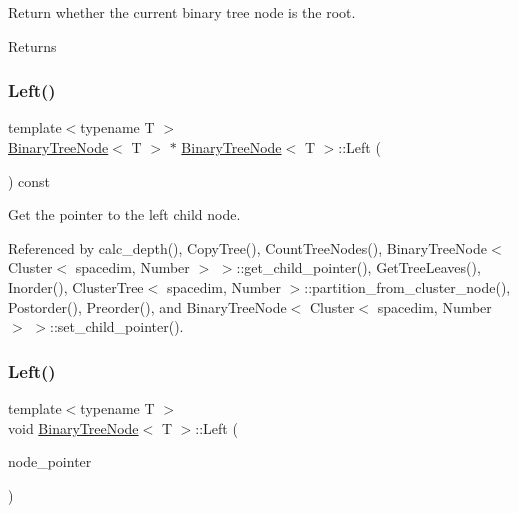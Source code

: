 Return whether the current binary tree node is the root. \begin{DoxyReturn}{Returns}

\end{DoxyReturn}
\mbox{\label{classBinaryTreeNode_af72f5be84f4ac9fa158718032cada52a}} 
\subsubsection{\texorpdfstring{Left()}{Left()}\hspace{0.1cm}{\footnotesize\ttfamily [1/2]}}
{\footnotesize\ttfamily template$<$typename T $>$ \\
\hyperlink{classBinaryTreeNode}{Binary\+Tree\+Node}$<$ T $>$ $\ast$ \hyperlink{classBinaryTreeNode}{Binary\+Tree\+Node}$<$ T $>$\+::Left (\begin{DoxyParamCaption}\item[{void}]{ }\end{DoxyParamCaption}) const}

Get the pointer to the left child node. 

Referenced by calc\+\_\+depth(), Copy\+Tree(), Count\+Tree\+Nodes(), Binary\+Tree\+Node$<$ Cluster$<$ spacedim, Number $>$ $>$\+::get\+\_\+child\+\_\+pointer(), Get\+Tree\+Leaves(), Inorder(), Cluster\+Tree$<$ spacedim, Number $>$\+::partition\+\_\+from\+\_\+cluster\+\_\+node(), Postorder(), Preorder(), and Binary\+Tree\+Node$<$ Cluster$<$ spacedim, Number $>$ $>$\+::set\+\_\+child\+\_\+pointer().

\mbox{\label{classBinaryTreeNode_aa645c65bfa4702e04c97d70c37632a17}} 
\subsubsection{\texorpdfstring{Left()}{Left()}\hspace{0.1cm}{\footnotesize\ttfamily [2/2]}}
{\footnotesize\ttfamily template$<$typename T $>$ \\
void \hyperlink{classBinaryTreeNode}{Binary\+Tree\+Node}$<$ T $>$\+::Left (\begin{DoxyParamCaption}\item[{const \hyperlink{classBinaryTreeNode}{Binary\+Tree\+Node}$<$ T $>$ $\ast$}]{node\+\_\+pointer }\end{DoxyParamCaption})}

